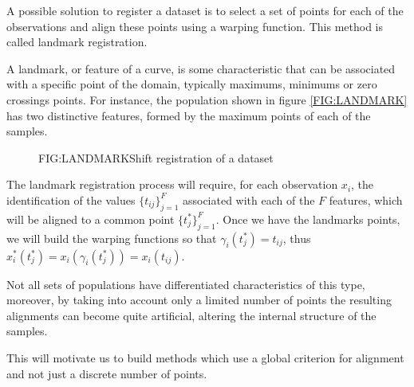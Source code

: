 A possible solution to register a dataset is to select a set of points for each
of the observations and align these points using a warping function. This method
 is called landmark registration.

A landmark, or feature of a curve, is some characteristic that can be
associated with a specific point of the domain, typically maximums, minimums or
zero crossings points. For instance, the population shown in figure
\ref{FIG:LANDMARK} has two distinctive features, formed by the maximum points of
 each of the samples.


\begin{figure}[Shift registration of a dataset]{FIG:LANDMARK}{Shift registration of a dataset}
   \quad
\end{figure}


The landmark registration process will require, for each observation $x_i$,
the identification of the values $\{t_{ij}\}_{j=1}^{F}$ associated with each of
the $F$ features, which will be aligned to a common point
$\{t_{j}^*\}_{j=1}^{F}$. Once we have the landmarks points, we will build the
 warping functions so that $\gamma_i(t_j^*)=t_{ij}$, thus
$x_i^*(t_j^*) = x_i(\gamma_i(t_j^*)) = x_i(t_{ij})$.

Not all sets of populations have differentiated characteristics of this type,
moreover, by taking into account only a limited number of points the resulting
alignments can become quite artificial, altering the internal structure of the
samples.

This will motivate us to build methods which use a global criterion for
alignment and not just a discrete number of points.

